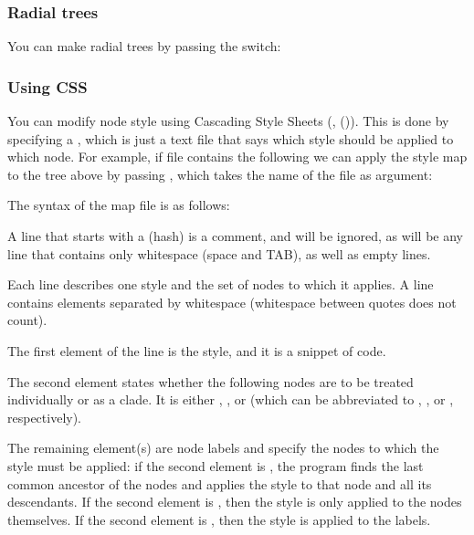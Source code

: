 \subsubsection{Radial trees}

You can make radial trees by passing the  switch:
\startalignment[center]
\stopalignment

\subsubsection[sct_display_svg_css]{Using CSS}

You can modify node style using Cascading Style Sheets (\css,
()). This is done by specifying a ,
which is just a text file that says which style should be applied to which node.
For example, if file  contains the following
\startnarrower
{}
\stopnarrower we can apply the style map to
the tree above by passing , which takes the name of the \css{} file
as argument:

\startalignment[center]
\stopalignment

The syntax of the \css{} map file is as follows:
\startitemize
	\item A line that starts with a \type{\#} (hash) is a comment, and will be
	ignored, as will be any line that contains only whitespace (space and TAB),
	as well as empty lines.
	\item Each line describes one style and the set of nodes to which it applies.
	A line contains elements separated by whitespace (whitespace between quotes
	does not count). 
	\item The first element of the line is the style, and it is a snippet of
	\css{} code. 
	\item The second element states whether the following nodes are to be treated
	individually or as a clade. It is either ,
	, or  (which can be abbreviated to
	, , or , respectively). 
	\item The remaining element(s) are node labels and specify the nodes to which
	the style must be applied: if the second element is , the
	program finds the last common ancestor of the nodes and applies the style to
	that node and all its descendants. If the second element is
	, then the style is only applied to the nodes themselves.
	If the second element is , then the style is applied to the
	labels.
\stopitemize

